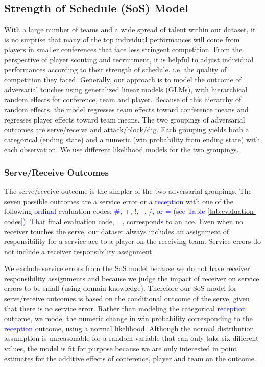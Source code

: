 \documentclass[USenglish]{article}
\theoremstyle{dgthm}
\theoremstyle{dgdef}
\begin{document}
\subsection{Strength of Schedule (SoS) Model}
\label{sec:strength-of-schedule}

With a large number of teams and a wide spread of talent within our dataset, it is no surprise that many of the top individual performances will come from players in smaller conferences that face less stringent competition. From the perspective of player scouting and recruitment, it is helpful to adjust individual performances according to their strength of schedule, i.e. the quality of competition they faced. Generally, our approach is to model the outcome of adversarial touches using generalized linear models (GLMs), with hierarchical random effects for conference, team and player. Because of this hierarchy of random effects, the model regresses team effects toward conference means and regresses player effects toward team means. The two groupings of adversarial outcomes are serve/receive and attack/block/dig. Each grouping yields both a categorical (ending state) and a numeric (win probability from ending state) with each observation. We use different likelihood models for the two groupings.

\subsubsection{Serve/Receive Outcomes}

The serve/receive outcome is the simpler of the two adversarial groupings. The seven possible outcomes are a service error or a \textcolor{blue}{reception} with one of the following \textcolor{blue}{ordinal} evaluation codes: \textcolor{blue}{\#, +, !, --, /, or = (see Table \ref{tab:evaluation-codes})}. That final evaluation code, =, correspond\textcolor{blue}{s} to an ace. Even when no receiver touches the serve, our dataset always includes an assignment of responsibility for a service ace to a player on the receiving team. Service errors do not include a receiver responsibility assignment.

We exclude service errors from the SoS model because we do not have receiver responsibility assignments and because we judge the impact of receiver on service errors to be small (using domain knowledge). Therefore our SoS model for serve/receive outcomes is based on the conditional outcome of the serve, given that there is no service error. Rather than modeling the categorical \textcolor{blue}{reception} outcome, we model the numeric change in win probability corresponding to the \textcolor{blue}{reception} outcome, using a normal likelihood. Although the normal distribution assumption is unreasonable for a random variable that can only take six different values, the model is fit for purpose because we are only interested in point estimates for the additive effects of conference, player and team on the outcome.
\end{document}
